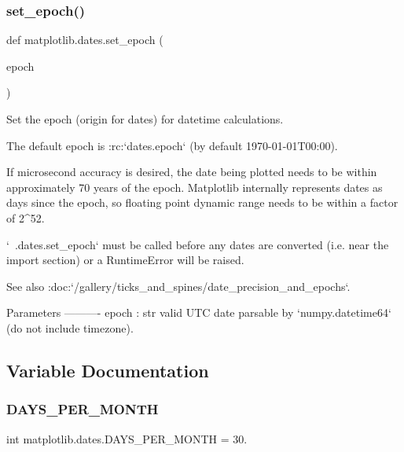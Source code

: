 \subsubsection{\texorpdfstring{set\+\_\+epoch()}{set\_epoch()}}
{\footnotesize\ttfamily def matplotlib.\+dates.\+set\+\_\+epoch (\begin{DoxyParamCaption}\item[{}]{epoch }\end{DoxyParamCaption})}

\begin{DoxyVerb}Set the epoch (origin for dates) for datetime calculations.

The default epoch is :rc:`dates.epoch` (by default 1970-01-01T00:00).

If microsecond accuracy is desired, the date being plotted needs to be
within approximately 70 years of the epoch. Matplotlib internally
represents dates as days since the epoch, so floating point dynamic
range needs to be within a factor of 2^52.

`~.dates.set_epoch` must be called before any dates are converted
(i.e. near the import section) or a RuntimeError will be raised.

See also :doc:`/gallery/ticks_and_spines/date_precision_and_epochs`.

Parameters
----------
epoch : str
    valid UTC date parsable by `numpy.datetime64` (do not include
    timezone).\end{DoxyVerb}
 

\subsection{Variable Documentation}
\mbox{\label{namespacematplotlib_1_1dates_ae41267b519d32846b5ce97c359897afe}} 
\subsubsection{\texorpdfstring{D\+A\+Y\+S\+\_\+\+P\+E\+R\+\_\+\+M\+O\+N\+TH}{DAYS\_PER\_MONTH}}
{\footnotesize\ttfamily int matplotlib.\+dates.\+D\+A\+Y\+S\+\_\+\+P\+E\+R\+\_\+\+M\+O\+N\+TH = 30.}

